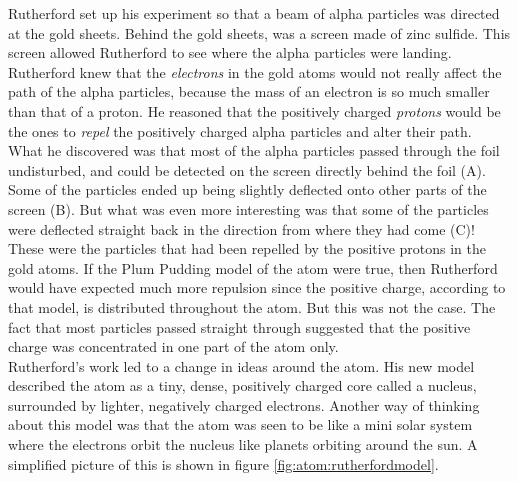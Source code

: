 Rutherford set up his experiment so that a beam of alpha particles was directed at the gold sheets. Behind the gold sheets, was a screen made of zinc sulfide. This screen allowed Rutherford to see where the alpha particles were landing. Rutherford knew that the \textit{electrons} in the gold atoms would not really affect the path of the alpha particles, because the mass of an electron is so much smaller than that of a proton. He reasoned that the positively charged \textit{protons} would be the ones to \textit{repel} the positively charged alpha particles and alter their path. \\

What he discovered was that most of the alpha particles passed through the foil undisturbed, and could be detected on the screen directly behind the foil (A). Some of the particles ended up being slightly deflected onto other parts of the screen (B). But what was even more interesting was that some of the particles were deflected straight back in the direction from where they had come (C)! These were the particles that had been repelled by the positive protons in the gold atoms. If the Plum Pudding model of the atom were true, then Rutherford would have expected much more repulsion since the positive charge, according to that model, is distributed throughout the atom. But this was not the case. The fact that most particles passed straight through suggested that the positive charge was concentrated in one part of the atom only.\\

Rutherford's work led to a change in ideas around the atom. His new model described the atom as a tiny, dense, positively charged core called a nucleus, surrounded by lighter, negatively charged electrons. Another way of thinking about this model was that the atom was seen to be like a mini solar system where the electrons orbit the nucleus like planets orbiting around the sun. A simplified picture of this is shown in figure \ref{fig:atom:rutherfordmodel}. \\

